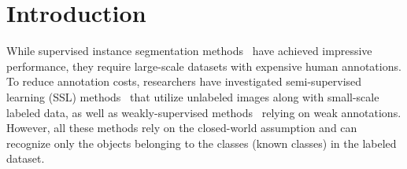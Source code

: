 


\section{Introduction}
\label{sec:intro}
While supervised instance segmentation methods~\cite{he2017mask,cheng2022masked,jain2023oneformer} have achieved impressive performance, they require large-scale datasets with expensive human annotations. To reduce annotation costs, researchers have investigated semi-supervised learning (SSL) methods~\cite{bellver2019budget,yang2022bias, Berrada2024Guided} that utilize unlabeled images along with small-scale labeled data, as well as weakly-supervised methods~\cite{Lan2021DiscoBox} relying on weak annotations. However, all these methods rely on the closed-world assumption and can recognize only the objects belonging to the classes (\ie known classes) in the labeled dataset.


